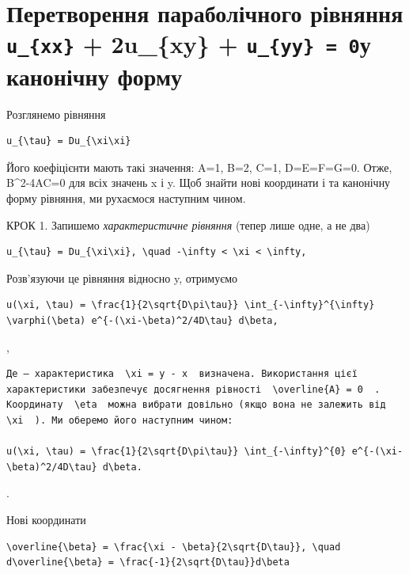 \documentclass[
  ukrainian,
]{article}
\begin{document}
\section{\texorpdfstring{Перетворення параболічного рівняння
\texttt{u\_\{xx\}} + 2u\_\{xy\} + \texttt{u\_\{yy\}\ =\ 0}у канонічну
форму}{Перетворення параболічного рівняння u\_\{xx\} + 2u\_\{xy\} + u\_\{yy\} = 0у канонічну форму}}\label{ux43fux435ux440ux435ux442ux432ux43eux440ux435ux43dux43dux44f-ux43fux430ux440ux430ux431ux43eux43bux456ux447ux43dux43eux433ux43e-ux440ux456ux432ux43dux44fux43dux43dux44f-u_xx-2u_xy-u_yy-0ux443-ux43aux430ux43dux43eux43dux456ux447ux43dux443-ux444ux43eux440ux43cux443}

Розглянемо рівняння

\begin{verbatim}
u_{\tau} = Du_{\xi\xi}
\end{verbatim}

Його коефіцієнти мають такі значення: A=1, B=2, C=1, D=E=F=G=0. Отже,
B\^{}2-4AC=0 для всіх значень x і y. Щоб знайти нові координати \xi  і
\eta  та канонічну форму рівняння, ми рухаємося наступним чином.

КРОК 1. Запишемо \emph{характеристичне рівняння} (тепер лише одне, а не
два)

\begin{verbatim}
u_{\tau} = Du_{\xi\xi}, \quad -\infty < \xi < \infty,
\end{verbatim}

Розв'язуючи це рівняння відносно y, отримуємо

\begin{verbatim}
u(\xi, \tau) = \frac{1}{2\sqrt{D\pi\tau}} \int_{-\infty}^{\infty} \varphi(\beta) e^{-(\xi-\beta)^2/4D\tau} d\beta,
\end{verbatim}

,

\begin{verbatim}
Де — характеристика  \xi = y - x  визначена. Використання цієї характеристики забезпечує досягнення рівності  \overline{A} = 0  . Координату  \eta  можна вибрати довільно (якщо вона не залежить від  \xi  ). Ми оберемо його наступним чином:

u(\xi, \tau) = \frac{1}{2\sqrt{D\pi\tau}} \int_{-\infty}^{0} e^{-(\xi-\beta)^2/4D\tau} d\beta.
\end{verbatim}

.

Нові координати

\begin{verbatim}
\overline{\beta} = \frac{\xi - \beta}{2\sqrt{D\tau}}, \quad d\overline{\beta} = \frac{-1}{2\sqrt{D\tau}}d\beta
\end{verbatim}
\end{document}
